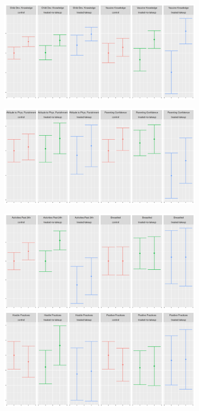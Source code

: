 \documentclass{article}
\begin{document}

\begin{figure}[H]
  \centering
\includegraphics[width=0.9\textwidth]{plots/pre_post/Serbia: Vaccine Knowledge.png}
\end{figure}



\begin{figure}[H]
  \centering
\includegraphics[width=0.9\textwidth]{plots/pre_post/Serbia: Parenting Confidence.png}
\end{figure}



\begin{figure}[H]
  \centering
\includegraphics[width=0.9\textwidth]{plots/pre_post/Serbia: Breastfed.png}
\includegraphics[width=0.9\textwidth]{plots/pre_post/Serbia: Positive Practices.png}
\end{figure}
\end{document}
